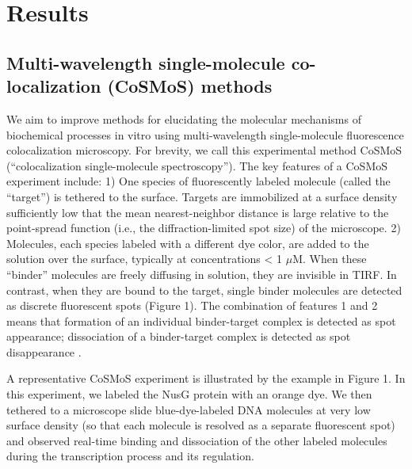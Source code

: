 \section{Results}

\subsection{Multi-wavelength single-molecule co-localization (CoSMoS) methods}

We aim to improve methods for elucidating the molecular mechanisms of biochemical processes in vitro using multi-wavelength single-molecule fluorescence colocalization microscopy. For brevity, we call this experimental method CoSMoS (“colocalization single-molecule spectroscopy”). The key features of a CoSMoS experiment include: 1) One species of fluorescently labeled molecule (called the “target”) is tethered to the surface. Targets are immobilized at a surface density sufficiently low that the mean nearest-neighbor distance is large relative to the point-spread function (i.e., the diffraction-limited spot size) of the microscope. 2) Molecules, each species labeled with a different dye color, are added to the solution over the surface, typically at concentrations < 1 $\mu$M. When these “binder” molecules are freely diffusing in solution, they are invisible in TIRF. In contrast, when they are bound to the target, single binder molecules are detected as discrete fluorescent spots (Figure 1). The combination of features 1 and 2 means that formation of an individual binder-target complex is detected as spot appearance; dissociation of a binder-target complex is detected as spot disappearance \citep{friedman_viewing_2006, friedman_cosmos_analysis_2015}.

A representative CoSMoS experiment is illustrated by the example in Figure 1. In this experiment, we labeled the NusG protein with an orange dye. We then tethered to a microscope slide blue-dye-labeled DNA molecules at very low surface density (so that each molecule is resolved as a separate fluorescent spot) and observed real-time binding and dissociation of the other labeled molecules during the transcription process and its regulation.

